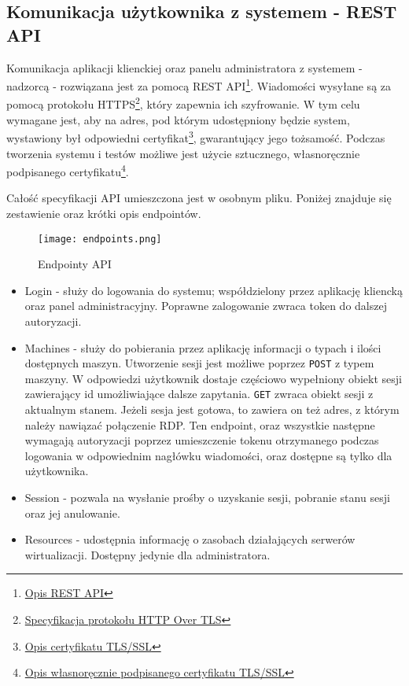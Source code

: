 \documentclass[../../deliverable-two.tex]{subfiles}
\begin{document}
\subsection{Komunikacja użytkownika z systemem - REST API}

Komunikacja aplikacji klienckiej oraz panelu administratora z systemem - nadzorcą - rozwiązana jest za pomocą REST API\footnote{\href{https://restfulapi.net/}{Opis REST API}}. Wiadomości wysyłane są za pomocą protokołu HTTPS\footnote{\href{https://datatracker.ietf.org/doc/html/rfc2818}{Specyfikacja protokołu HTTP Over TLS}}, który zapewnia ich szyfrowanie. W tym celu wymagane jest, aby na adres, pod którym udostępniony będzie system, wystawiony był odpowiedni certyfikat\footnote{\href{https://protonmail.com/blog/tls-ssl-certificate/}{Opis certyfikatu TLS/SSL}}, gwarantujący jego tożsamość. Podczas tworzenia systemu i testów możliwe jest użycie sztucznego, własnoręcznie podpisanego certyfikatu\footnote{\href{https://aboutssl.org/what-is-self-sign-certificate/}{Opis własnoręcznie podpisanego certyfikatu TLS/SSL}}.

Całość specyfikacji API umieszczona jest w osobnym pliku. Poniżej znajduje się zestawienie oraz krótki opis endpointów.

\begin{figure}[H]
    \centering\texttt{[image: endpoints.png]}
    \caption{Endpointy API}
\end{figure}

\begin{itemize}
    \item Login - służy do logowania do systemu; współdzielony przez aplikację kliencką oraz panel administracyjny. Poprawne zalogowanie zwraca token do dalszej autoryzacji.
    \item Machines - służy do pobierania przez aplikację informacji o typach i ilości dostępnych maszyn. Utworzenie sesji jest możliwe poprzez \texttt{POST} z typem maszyny. W odpowiedzi użytkownik dostaje częściowo wypełniony obiekt sesji zawierający id umożliwiające dalsze zapytania. \texttt{GET} zwraca obiekt sesji z aktualnym stanem. Jeżeli sesja jest gotowa, to zawiera on też adres, z którym należy nawiązać połączenie RDP. Ten endpoint, oraz wszystkie następne wymagają autoryzacji poprzez umieszczenie tokenu otrzymanego podczas logowania w odpowiednim nagłówku wiadomości, oraz dostępne są tylko dla użytkownika.
    \item Session - pozwala na wysłanie prośby o uzyskanie sesji, pobranie stanu sesji oraz jej anulowanie.
    \item Resources - udostępnia informację o zasobach działających serwerów wirtualizacji. Dostępny jedynie dla administratora.
\end{itemize}
\end{document}
